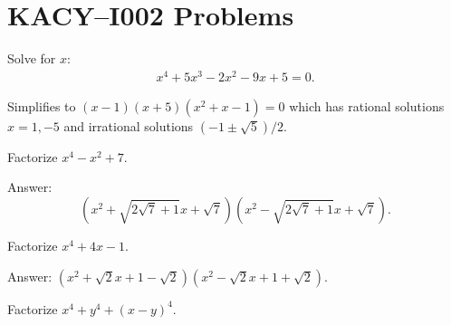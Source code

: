 \documentclass[12pt,a4paper]{memoir}
\theoremstyle{definition}
\begin{document}
	
\newpage

\section*{KACY--I002 Problems}

\setcounter{question}{2}
	
\begin{question}
	Solve for $x$:
	\begin{align*}
		x^4+5x^3-2x^2-9x+5=0.
	\end{align*}
\end{question}

\begin{solution}
	Simplifies to $(x-1)(x+5)(x^2+x-1)=0$ which has rational solutions $x=1,-5$ and irrational solutions $(-1\pm\sqrt{5})/2$.
\end{solution}





\setcounter{question}{38}


\begin{tcolorbox}
	\begin{question}
		Factorize $x^4-x^2+7$.
	\end{question}
\end{tcolorbox}

\begin{solution}%
	Answer: $$(x^2+\sqrt{2\sqrt{7}+1}x + \sqrt{7})(x^2-\sqrt{2\sqrt{7}+1}x + \sqrt{7}).$$
\end{solution}



\begin{tcolorbox}
	\begin{question}
		Factorize $x^4+4x-1$.
	\end{question}
\end{tcolorbox}

\begin{solution}%
	Answer: $(x^2+\sqrt{2}x + 1 - \sqrt{2})(x^2 - \sqrt{2}x+1 + \sqrt{2})$.
\end{solution}


\setcounter{question}{58}


\begin{tcolorbox}
	\begin{question}
		Factorize $x^4+y^4+(x-y)^4$.
	\end{question}
\end{tcolorbox}
\end{document}

